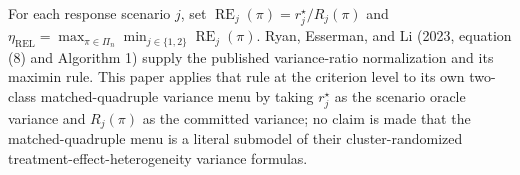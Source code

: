 For each response scenario \(j\), set \(\operatorname{RE}_j(\pi)=r_j^\star/R_j(\pi)\) and \(\eta_{\mathrm{REL}}=\max_{\pi\in\Pi_n}\min_{j\in\{1,2\}}\operatorname{RE}_j(\pi)\). Ryan, Esserman, and Li (2023, equation (8) and Algorithm 1) supply the published variance-ratio normalization and its maximin rule. This paper applies that rule at the criterion level to its own two-class matched-quadruple variance menu by taking \(r_j^\star\) as the scenario oracle variance and \(R_j(\pi)\) as the committed variance; no claim is made that the matched-quadruple menu is a literal submodel of their cluster-randomized treatment-effect-heterogeneity variance formulas.